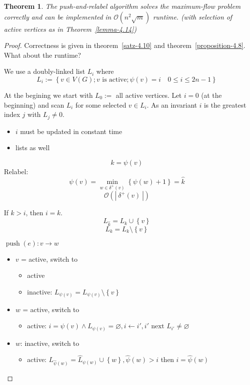 \documentclass{article}
\newtheorem{theorem}{Theorem}
\newcommand{\card}[1]{\left|\:\!#1\:\!\right|}
\newcommand{\set}[1]{\left\{#1\right\}}
\DeclareMathOperator{\push}{push}
\begin{document}
\begin{theorem}\label{satz-4.15}
  The push-and-relabel algorithm solves the maximum-flow problem correctly and can be implemented in $\mathcal{O}(n^2 \sqrt{m})$ runtime.
  (with selection of active vertices as in Theorem~\ref{lemma-4.14})
\end{theorem}

\begin{proof}
  Correctness is given in theorem~\ref{satz-4.10} and theorem~\ref{proposition-4.8}. What about the runtime?

  We use a doubly-linked list $L_i$ where 
  \[
    L_i := \set{v \in V(G); v \text{ is active}; \psi(v) = i \quad 0 \leq i \leq 2n - 1}
  \]

  At the begining we start with $L_0 := $ all active vertices.
  Let $i = 0$ (at the beginning) and scan $L_i$ for some selected $v \in L_i$.
  As an invariant $i$ is the greatest index $j$ with $L_j \neq 0$.

  \begin{itemize}
    \item $i$ must be updated in constant time
    \item lists as well
  \end{itemize}

  \[ k = \psi(v) \]
  Relabel: \[ \psi(v) = \min_{w\in\delta^+(v)}{\set{\psi(w) + 1}} = \hat k \]
  \[ \mathcal{O}(\card{\delta^+(v)}) \]

  If $k > i$, then $i = k$.
  \[ L_{\hat k} = L_k \cup \set{v} \]
  \[ L_k = L_k \setminus \set{v} \]

  $\push(e): v \rightarrow w$
  \begin{itemize}
    \item $v$ = active, switch to
      \begin{itemize}
        \item active
        \item inactive: $L_{\psi(v)} = L_{\psi(v)} \setminus \set{v}$
      \end{itemize}
    \item $w$ = active, switch to
      \begin{itemize}
        \item active: $i = \psi(v) \land L_{\psi(v)} = \diameter, i \leftarrow i', i' \text{ next } L_{i'} \neq \diameter$
      \end{itemize}
    \item $w$: inactive, switch to
      \begin{itemize}
        \item active: $L_{\hat \psi(w)} = \hat L_{\psi(w)} \cup \set{w}, \hat\psi(w) > i$ then $i = \hat\psi(w)$
      \end{itemize}
  \end{itemize}


\end{proof}
\end{document}
